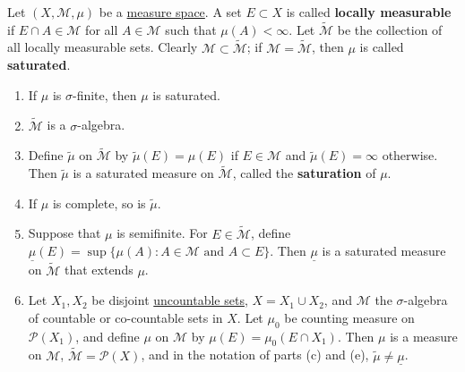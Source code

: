 	\begin{exercise}[Folland 1.16]
		Let $(X, \mathcal{M}, \mu)$ be a \hyperref[def:measure-space]{measure space}. A set $E \subset X$ is called \textbf{locally measurable} if $E \cap A \in \mathcal{M}$ for all $A \in \mathcal{M}$ such that $\mu(A) < \infty$. Let $\widetilde{\mathcal{M}}$ be the collection of all locally measurable sets. Clearly $\mathcal{M} \subset \widetilde{\mathcal{M}}$; if $\mathcal{M} = \widetilde{\mathcal{M}}$, then $\mu$ is called \textbf{saturated}.
		\begin{enumerate}[label=\textbf{\alph*.}]
			\item If $\mu$ is $\sigma$-finite, then $\mu$ is saturated.
			\item $\widetilde{\mathcal{M}}$ is a $\sigma$-algebra.
			\item Define $\widetilde{\mu}$ on $\widetilde{\mathcal{M}}$ by $\widetilde{\mu}(E) = \mu(E)$ if $E \in \mathcal{M}$ and $\widetilde{\mu}(E) = \infty$ otherwise. Then $\widetilde{\mu}$ is a saturated measure on $\widetilde{\mathcal{M}}$, called the \textbf{saturation} of $\mu$.
			\item If $\mu$ is complete, so is $\widetilde{\mu}$.
			\item Suppose that $\mu$ is semifinite. For $E \in \widetilde{\mathcal{M}}$, define $\underline{\mu}(E) = \sup\{\mu(A) : A \in \mathcal{M} \text{ and } A \subset E\}$. Then $\underline{\mu}$ is a saturated measure on $\widetilde{\mathcal{M}}$ that extends $\mu$.
			\item Let $X_1, X_2$ be disjoint \hyperref[st-def:uncountable-set]{uncountable sets}, $X = X_1 \cup X_2$, and $\mathcal{M}$ the $\sigma$-algebra of countable or co-countable sets in $X$. Let $\mu_0$ be counting measure on $\mathcal{P}(X_1)$, and define $\mu$ on $\mathcal{M}$ by $\mu(E) = \mu_0(E \cap X_1)$. Then $\mu$ is a measure on $\mathcal{M}$, $\widetilde{\mathcal{M}} = \mathcal{P}(X)$, and in the notation of parts (c) and (e), $\widetilde{\mu} \neq \underline{\mu}$.
		\end{enumerate}
	\end{exercise}
	\begin{solution}

	\end{solution}


